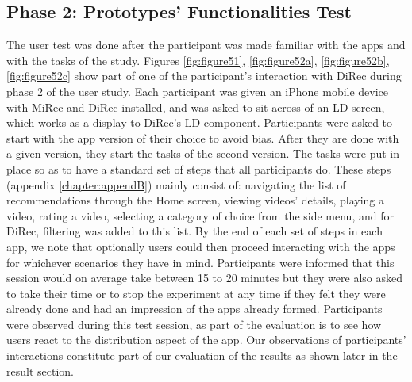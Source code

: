 \subsection{Phase 2: Prototypes' Functionalities Test}
The user test was done after the participant was made familiar with the apps and
with the tasks of the study. Figures \ref{fig:figure51}, \ref{fig:figure52a},
\ref{fig:figure52b}, \ref{fig:figure52c} show part of one of the participant's
interaction with DiRec during phase 2 of the user study. Each participant was given an iPhone mobile device with MiRec and DiRec installed, and was asked to sit across of an LD screen, which works as a display to DiRec's LD component.
Participants were asked to start with the app version of their choice to avoid
bias. After they are done with a given version, they start the tasks of the
second version. The tasks were put in place so as to have a standard set of
steps that all participants do. These steps (appendix \ref{chapter:appendB})
mainly consist of:
navigating the list of recommendations through the Home screen, viewing videos'
details, playing a video, rating a video, selecting a category of choice from the side menu, and
for DiRec, filtering was added to this list. By the end of each set of steps in
each app, we note that optionally users could then proceed interacting with the
apps for whichever scenarios they have in mind. Participants were informed that
this session would on average take between 15 to 20 minutes but they were also
asked to take their time or to stop the experiment at any time if they felt they
were already done and had an impression of the apps already formed. Participants
were observed during this test session, as part of the evaluation is to see how users react to the distribution aspect of the app.
Our observations of participants' interactions constitute part of our evaluation
of the results as shown later in the result section.

